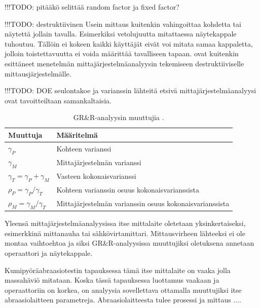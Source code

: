 \documentclass[12pt,a4paper,finnish]{tutthesis}
\newcommand\todo[1]{{\color{red}!!!TODO: #1}} %
\begin{document}
\todo{pitääkö selittää random factor ja fixed factor?}

\todo{destruktiivinen}
Usein mittaus kuitenkin vahingoittaa kohdetta tai näytettä jollain tavalla.
Esimerkiksi vetolujuutta mitattaessa näytekappale tuhoutuu. Tällöin ei
kokeen kaikki käyttäjät eivät voi mitata samaa kappaletta, jolloin toistettavuutta
ei voida määrittää tavalliseen tapaan. \textcite{mitchell1997,bergeret2002improving}
ovat kuitenkin esittäneet menetelmän mittajärjestelmäanalyysin tekemiseen
destruktiiviselle mittausjärjestelmälle.


\textcite{Gorman2002}


\todo{DOE seulontakoe ja varianssin lähteitä etsivä mittajärjestelmäanalyysi ovat
tavoitteiltaan samankaltaisia.}

\begin{table}[]
\centering
\caption{GR\&R-analyysin muuttujia \parencite{Burdick2003}.}
\label{table:grr}
\begin{tabular}{@{}ll@{}}
\toprule
Muuttuja                           & Määritelmä                                              \\ \midrule
$\gamma _P$                         & Kohteen varianssi                                       \\
$\gamma _M$                         & Mittajärjestelmän varianssi                             \\
$\gamma _T = \gamma _P + \gamma _M$ & Vasteen kokonaisvarianssi                               \\
$\rho _P = \gamma _P / \gamma _T$   & Kohteen varianssin osuus kokonaisvarianssista           \\
$\rho _M = \gamma _M / \gamma _T$   & Mittajärjestelmän varianssin osuus kokonaisvarianssista
\end{tabular}
\end{table}

Yleensä mittajärjestelmäanalyysissa itse mittalaite oletetaan
yksinkertaiseksi, esimerkkinä mittanauha tai sähkövirtamittari.
Mittausvirheen lähteeksi ei ole montaa vaihtoehtoa ja siksi GR\&R-analyysissa
muuttujiksi oletuksena annetaan operaattori ja näytekappale.

Kumipyöräabraasiotestin tapauksessa tämä itse mittalaite on vaaka jolla
massahäviö mitataan. Koska tässä tapauksessa luottamus vaakaan ja operaattoriin
on korkea, on analyysia sovellettava ottamalla muuttujiksi itse
abraasiolaitteen parametreja. Abraasiolaitteesta tulee prosessi ja mittaus
....
\end{document}
